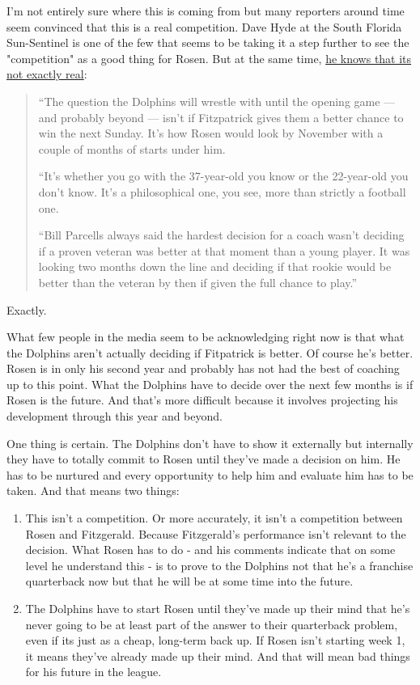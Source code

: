 \documentclass[11pt]{article}
\begin{document}
\begin{itemize}
I'm not entirely sure where this is coming from but many reporters around time seem convinced that this is a real competition.  Dave Hyde at the South Florida Sun-Sentinel is one of the few that seems to be taking it a step further to see the "competition" as a good thing for Rosen.  But at the same time, \href{https://www.sun-sentinel.com/sports/miami-dolphins/fl-sp-hyde-dolphins-qbs--20190606-p47uiimvcrd23bwerijibktbfq-story.html}{he knows that its not exactly real}:

\begin{quote}
``The question the Dolphins will wrestle with until the opening game — and probably beyond — isn’t if Fitzpatrick gives them a better chance to win the next Sunday. It’s how Rosen would look by November with a couple of months of starts under him.

``It’s whether you go with the 37-year-old you know or the 22-year-old you don’t know. It’s a philosophical one, you see, more than strictly a football one.

``Bill Parcells always said the hardest decision for a coach wasn’t deciding if a proven veteran was better at that moment than a young player. It was looking two months down the line and deciding if that rookie would be better than the veteran by then if given the full chance to play.''
\end{quote}

Exactly.

What few people in the media seem to be acknowledging right now is that what the Dolphins aren't actually deciding if Fitpatrick is better.  Of course he's better.  Rosen is in only his second year and probably has not had the best of coaching up to this point.  What the Dolphins have to decide over the next few months is if Rosen is the future.  And that's more difficult because it involves projecting his development through this year and beyond.

One thing is certain.  The Dolphins don't have to show it externally but internally they have to totally commit to Rosen until they've made a decision on him.  He has to be nurtured and every opportunity to help him and evaluate him has to be taken.  And that means two things:

\begin{enumerate}
\item This isn't a competition.  Or more accurately, it isn't a
  competition between Rosen and Fitzgerald.  Because Fitzgerald's
  performance isn't relevant to the decision.  What Rosen has to do -
  and his comments indicate that on some level he understand this - is
  to prove to the Dolphins not that he's a franchise quarterback now
  but that he will be at some time into the future.
\item The Dolphins have to start Rosen until they've made up their
  mind that he's never going to be at least part of the answer to
  their quarterback problem, even if its just as a cheap, long-term
  back up.  If Rosen isn't starting week 1, it means they've already
  made up their mind.  And that will mean bad things for his future in
  the league.
\end{enumerate}


\end{itemize}
\end{document}
